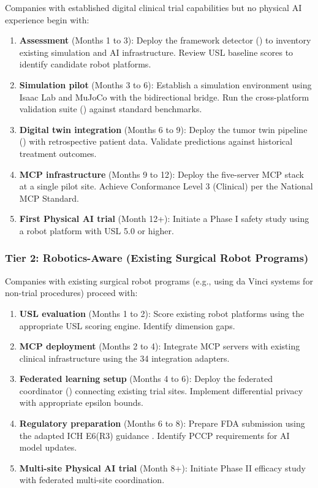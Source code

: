 \documentclass[11pt,letterpaper]{article}
\begin{document}
Companies with established digital clinical trial capabilities but no physical AI experience \SHOULD{} begin with:

\begin{enumerate}
  \item \textbf{Assessment} (Months 1 to 3): Deploy the framework detector () to inventory existing simulation and AI infrastructure. Review USL baseline scores to identify candidate robot platforms.
  \item \textbf{Simulation pilot} (Months 3 to 6): Establish a simulation environment using Isaac Lab and MuJoCo with the bidirectional bridge. Run the cross-platform validation suite () against standard benchmarks.
  \item \textbf{Digital twin integration} (Months 6 to 9): Deploy the tumor twin pipeline () with retrospective patient data. Validate predictions against historical treatment outcomes.
  \item \textbf{MCP infrastructure} (Months 9 to 12): Deploy the five-server MCP stack at a single pilot site. Achieve Conformance Level 3 (Clinical) per the National MCP Standard.
  \item \textbf{First Physical AI trial} (Month 12+): Initiate a Phase I safety study using a robot platform with USL 5.0 or higher.
\end{enumerate}

\subsubsection{Tier 2: Robotics-Aware (Existing Surgical Robot Programs)}

Companies with existing surgical robot programs (e.g., using da Vinci systems for non-trial procedures) \SHOULD{} proceed with:

\begin{enumerate}
  \item \textbf{USL evaluation} (Months 1 to 2): Score existing robot platforms using the appropriate USL scoring engine. Identify dimension gaps.
  \item \textbf{MCP deployment} (Months 2 to 4): Integrate MCP servers with existing clinical infrastructure using the 34 integration adapters.
  \item \textbf{Federated learning setup} (Months 4 to 6): Deploy the federated coordinator () connecting existing trial sites. Implement differential privacy with appropriate epsilon bounds.
  \item \textbf{Regulatory preparation} (Months 6 to 8): Prepare FDA submission using the adapted ICH E6(R3) guidance \cite{kawchak2026guidance}. Identify PCCP requirements for AI model updates.
  \item \textbf{Multi-site Physical AI trial} (Month 8+): Initiate Phase II efficacy study with federated multi-site coordination.
\end{enumerate}
\end{document}
